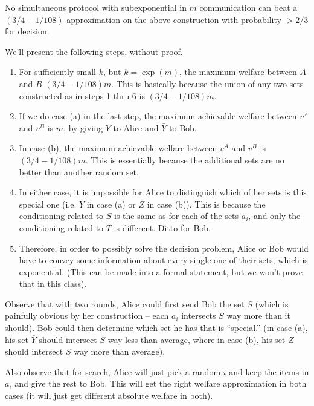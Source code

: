   \begin{theorem} 
    No simultaneous protocol with
    subexponential in $m$ communication can beat a $(3/4-1/108)$ approximation on
    the above construction with probability $> 2/3$ for decision.
  \end{theorem}
    We'll present the following steps, without proof.
    \begin{enumerate} 
      \item For sufficiently small $k$, but $k = \exp(m)$,
        the maximum welfare between $A$ and $B$ $(3/4-1/108)m$.
        This is basically because the union of any two
        sets constructed as in steps 1 thru 6 is $(3/4-1/108)m$.
      \item If we do case (a) in the last step,
        the maximum achievable welfare between $v^A$ and $v^B$ is $m$,
        by giving $Y$ to Alice and $\bar{Y}$ to Bob.
      \item In case (b), the maximum achievable welfare
        between $v^A$ and $v^B$ is $(3/4-1/108)m$. This is essentially because the
        additional sets are no better than another random set.
      \item In either case, it is impossible for Alice to 
        distinguish which of her sets is this
        special one (i.e. $Y$ in case (a) or $Z$ in case (b)).
        This is because the conditioning related to $S$ is the same as for
        each of the sets $a_i$, and only the conditioning related to $T$ is different.
        Ditto for Bob.
      \item Therefore, in order to possibly solve the
        decision problem, Alice or Bob would have to convey some information about
        every single one of their sets, which is exponential. (This can be made
        into a formal statement, but we won't prove that in this class).
    \end{enumerate}

  Observe that with two rounds, Alice could first send Bob the set $S$
  (which is painfully obvious by her construction -- each $a_i$ intersects
  $S$ way more than it should).
  Bob could then determine which set he has that is ``special.''
  (in case (a), his set $\bar{Y}$ should intersect $S$ way less than average,
  where in case (b), his set $Z$ should intersect $S$ way more than average).

  Also observe that for search, Alice will just pick a random $i$ and keep the
  items in $a_i$ and give the rest to Bob. This will get the right welfare
  approximation in both cases (it will just get different absolute welfare in
  both).

